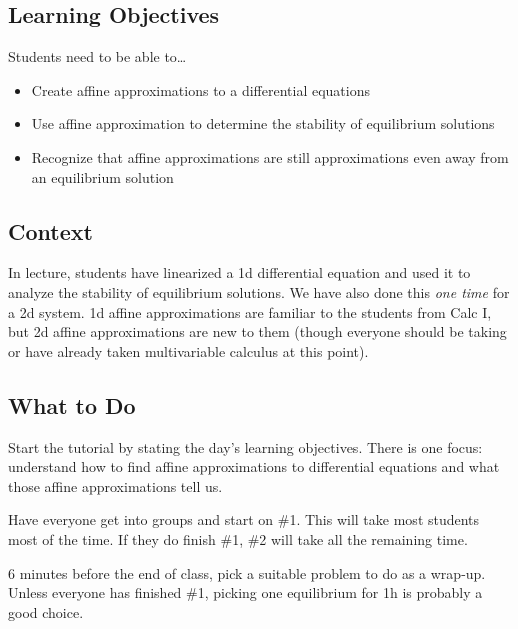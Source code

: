 \subsection*{Learning Objectives}
Students need to be able to\ldots
\begin{itemize}
	\item Create affine approximations to a differential equations
	\item Use affine approximation to determine the stability of equilibrium solutions
	\item Recognize that affine approximations are still approximations even away from an equilibrium solution
\end{itemize}

\subsection*{Context}
In lecture, students have linearized a 1d differential equation and used it to analyze the stability of equilibrium solutions.
We have also done this \emph{one time} for a 2d system. 1d affine approximations are familiar to the students from Calc I,
but 2d affine approximations are new to them (though everyone should be taking or have already taken multivariable calculus at this point).

\subsection*{What to Do}
Start the tutorial by stating the day's learning objectives. There is one focus: understand
how to find affine approximations to differential equations and what those affine approximations tell us.

Have everyone get into groups and start on \#1. This will take most students most of the time. If they
do finish \#1, \#2 will take all the remaining time.

6 minutes before the end of class, pick a suitable problem to do as a wrap-up. Unless everyone has finished \#1,
picking one equilibrium for 1h is probably a good choice.

